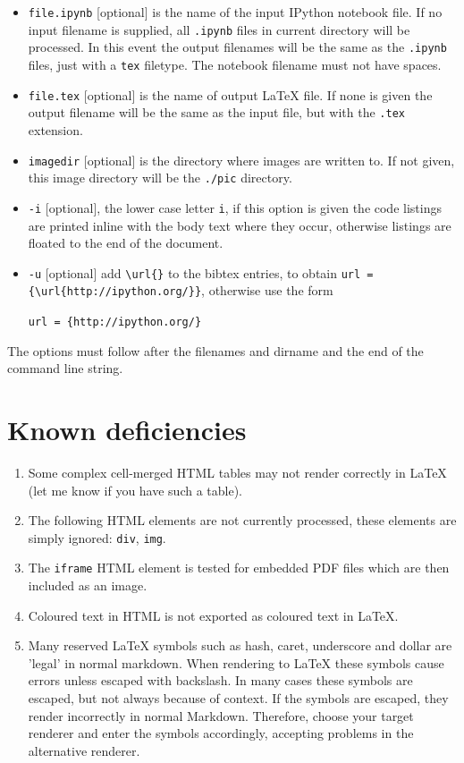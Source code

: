 \documentclass[english]{workpackage}[1996/06/02]
\begin{document}
\begin{itemize}
\item \verb+file.ipynb+  [optional]   is the name of the input IPython notebook file.   If no input filename is  supplied, all  \verb+.ipynb+ files in current directory will be processed.   In this event the output filenames will be the same as the \verb+.ipynb+ files, just with a \verb+tex+ filetype.  The notebook filename must not have spaces.
\item \verb+file.tex+ [optional]  is the name of output \LaTeX{} file. If none is given the output filename will be the same as the input file, but with the \verb+.tex+ extension.
\item \verb+imagedir+   [optional]   is the directory where images are written to.  If not given, this image directory will be the \verb+./pic+ directory.
\item \verb+-i+  [optional], the lower case letter \verb+i+, if this option is given the code     listings are printed inline with the body text where they occur,       otherwise listings are floated to the end of the document.
\item \verb+-u+ [optional] add \verb+\url{}+ to the bibtex entries, to obtain  \verb+url = {\url{http://ipython.org/}}+, otherwise use the form 


\verb+url = {http://ipython.org/}+
\end{itemize}

The options must follow after the filenames and dirname and the end of the command line string.




\section{Known deficiencies}
\label{sec:Knowndeficiencies}

\begin{enumerate}
\item Some complex cell-merged HTML tables may not render correctly in LaTeX (let me know if you have such a table).
\item The following HTML elements are not currently processed, these elements are simply ignored: \verb+div+,  \verb+img+.
\item The \verb+iframe+ HTML element is tested for embedded PDF files which are then included as an image.
\item Coloured text in HTML is not exported as coloured text in LaTeX.
\item Many reserved LaTeX symbols such as hash, caret, underscore and dollar are 'legal' in normal markdown.  When rendering to LaTeX these symbols cause errors unless escaped with backslash.  In many cases these symbols are escaped, but not always because of context.  If the symbols are escaped, they render incorrectly in normal Markdown. Therefore, choose your target renderer and enter the symbols accordingly, accepting problems in the alternative renderer.
\end{enumerate}
\end{document}
